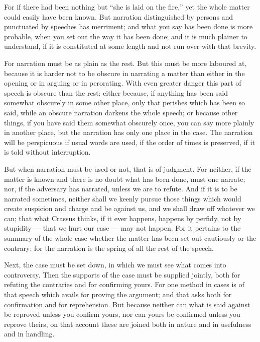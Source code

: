  For if there had been nothing but ``she is laid on the fire,'' yet the whole matter could easily have been known. But narration distinguished by persons and punctuated by speeches has merriment; and what you say has been done is more probable, when you set out the way it has been done; and it is much plainer to understand, if it is constituted at some length and not run over with that brevity.

 For narration must be as plain as the rest. But this must be more laboured at, because it is harder not to be obscure in narrating a matter than either in the opening or in arguing or in perorating. With even greater danger this part of speech is obscure than the rest: either because, if anything has been said somewhat obscurely in some other place, only that perishes which has been so said, while an obscure narration darkens the whole speech; or because other things, if you have said them somewhat obscurely once, you can say more plainly in another place, but the narration has only one place in the case. The narration will be perspicuous if usual words are used, if the order of times is preserved, if it is told without interruption.

 But when narration must be used or not, that is of judgment. For neither, if the matter is known and there is no doubt what has been done, must one narrate; nor, if the adversary has narrated, unless we are to refute. And if it is to be narrated sometimes, neither shall we keenly pursue those things which would create suspicion and charge and be against us, and we shall draw off whatever we can; that what Crassus thinks, if it ever happens, happens by perfidy, not by stupidity — that we hurt our case — may not happen. For it pertains to the summary of the whole case whether the matter has been set out cautiously or the contrary; for the narration is the spring of all the rest of the speech.

 Next, the case must be set down, in which we must see what comes into controversy. Then the supports of the case must be supplied jointly, both for refuting the contraries and for confirming yours. For one method in cases is of that speech which avails for proving the argument; and that asks both for confirmation and for reprehension. But because neither can what is said against be reproved unless you confirm yours, nor can yours be confirmed unless you reprove theirs, on that account these are joined both in nature and in usefulness and in handling.

